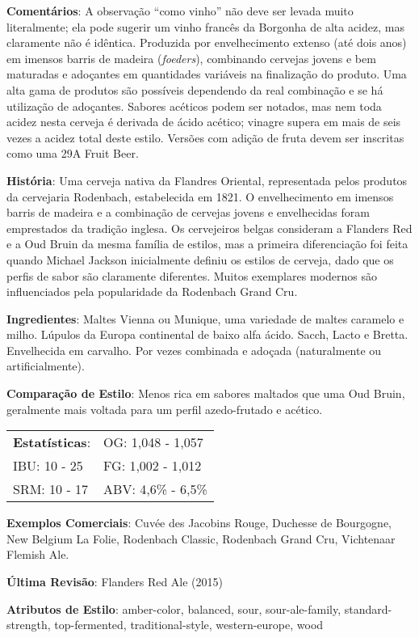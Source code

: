 \textbf{Comentários}: A observação “como vinho” não deve ser levada muito literalmente; ela pode sugerir um vinho francês da Borgonha de alta acidez, mas claramente não é idêntica. Produzida por envelhecimento extenso (até dois anos) em imensos barris de madeira (\textit{foeders}), combinando cervejas jovens e bem maturadas e adoçantes em quantidades variáveis na finalização do produto. Uma alta gama de produtos são possíveis dependendo da real combinação e se há utilização de adoçantes. Sabores acéticos podem ser notados, mas nem toda acidez nesta cerveja é derivada de ácido acético; vinagre supera em mais de seis vezes a acidez total deste estilo. Versões com adição de fruta devem ser inscritas como uma 29A Fruit Beer.

\textbf{História}: Uma cerveja nativa da Flandres Oriental, representada pelos produtos da cervejaria Rodenbach, estabelecida em 1821. O envelhecimento em imensos barris de madeira e a combinação de cervejas jovens e envelhecidas foram emprestados da tradição inglesa. Os cervejeiros belgas consideram a Flanders Red e a Oud Bruin da mesma família de estilos, mas a primeira diferenciação foi feita quando Michael Jackson inicialmente definiu os estilos de cerveja, dado que os perfis de sabor são claramente diferentes. Muitos exemplares modernos são influenciados pela popularidade da Rodenbach Grand Cru.

\textbf{Ingredientes}: Maltes Vienna ou Munique, uma variedade de maltes caramelo e milho. Lúpulos da Europa continental de baixo alfa ácido. Sacch, Lacto e Bretta. Envelhecida em carvalho. Por vezes combinada e adoçada (naturalmente ou artificialmente).

\textbf{Comparação de Estilo}: Menos rica em sabores maltados que uma Oud Bruin, geralmente mais voltada para um perfil azedo-frutado e acético.

\begin{tabular}{@{}p{35mm}p{35mm}@{}}
  \textbf{Estatísticas}: & OG: 1,048 - 1,057 \\
  IBU: 10 - 25  & FG: 1,002 - 1,012  \\
  SRM: 10 - 17  & ABV: 4,6\% - 6,5\%
\end{tabular}

\textbf{Exemplos Comerciais}: Cuvée des Jacobins Rouge, Duchesse de Bourgogne, New Belgium La Folie, Rodenbach Classic, Rodenbach Grand Cru, Vichtenaar Flemish Ale.

\textbf{Última Revisão}: Flanders Red Ale (2015)

\textbf{Atributos de Estilo}: amber-color, balanced, sour, sour-ale-family, standard-strength, top-fermented, traditional-style, western-europe, wood
